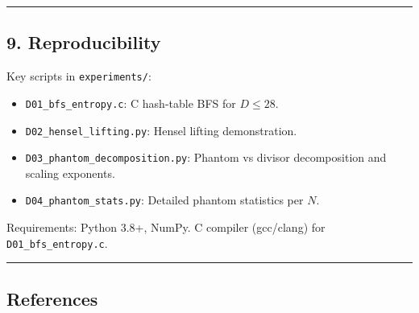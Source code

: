 \documentclass[
  11pt,
]{article}
\providecommand{\tightlist}{%
  \setlength{\itemsep}{0pt}\setlength{\parskip}{0pt}}
\begin{document}
\begin{center}\rule{0.5\linewidth}{0.5pt}\end{center}

\newpage

\subsection{9. Reproducibility}\label{reproducibility}

Key scripts in \texttt{experiments/}:

\begin{itemize}
\tightlist
\item
  \texttt{D01\_bfs\_entropy.c}: C hash-table BFS for \(D \leq 28\).
\item
  \texttt{D02\_hensel\_lifting.py}: Hensel lifting demonstration.
\item
  \texttt{D03\_phantom\_decomposition.py}: Phantom vs divisor decomposition and
  scaling exponents.
\item
  \texttt{D04\_phantom\_stats.py}: Detailed phantom statistics per \(N\).
\end{itemize}

Requirements: Python 3.8+, NumPy. C compiler (gcc/clang) for
\texttt{D01\_bfs\_entropy.c}.

\begin{center}\rule{0.5\linewidth}{0.5pt}\end{center}

\newpage

\subsection{References}\label{references}
\end{document}
